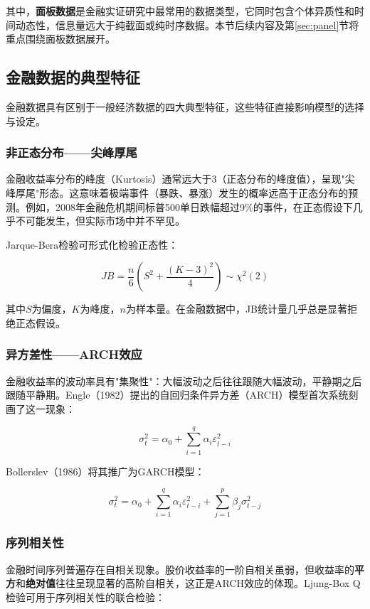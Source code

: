 其中，\textbf{面板数据}是金融实证研究中最常用的数据类型，它同时包含个体异质性和时间动态性，信息量远大于纯截面或纯时序数据。本节后续内容及第\ref{sec:panel}节将重点围绕面板数据展开。

\subsection{金融数据的典型特征}

金融数据具有区别于一般经济数据的四大典型特征，这些特征直接影响模型的选择与设定。

\subsubsection{非正态分布——尖峰厚尾}

金融收益率分布的峰度（Kurtosis）通常远大于3（正态分布的峰度值），呈现"尖峰厚尾"形态。这意味着极端事件（暴跌、暴涨）发生的概率远高于正态分布的预测。例如，2008年金融危机期间标普500单日跌幅超过9\%的事件，在正态假设下几乎不可能发生，但实际市场中并不罕见。

Jarque-Bera检验可形式化检验正态性：

\[
JB = \frac{n}{6}\left(S^2 + \frac{(K-3)^2}{4}\right) \sim \chi^2(2)
\]

其中$S$为偏度，$K$为峰度，$n$为样本量。在金融数据中，JB统计量几乎总是显著拒绝正态假设。

\subsubsection{异方差性——ARCH效应}

金融收益率的波动率具有"集聚性"：大幅波动之后往往跟随大幅波动，平静期之后跟随平静期。Engle（1982）提出的自回归条件异方差（ARCH）模型首次系统刻画了这一现象：

\[
\sigma_t^2 = \alpha_0 + \sum_{i=1}^{q} \alpha_i \varepsilon_{t-i}^2
\]

Bollerslev（1986）将其推广为GARCH模型：

\[
\sigma_t^2 = \alpha_0 + \sum_{i=1}^{q} \alpha_i \varepsilon_{t-i}^2 + \sum_{j=1}^{p} \beta_j \sigma_{t-j}^2
\]

\subsubsection{序列相关性}

金融时间序列普遍存在自相关现象。股价收益率的一阶自相关虽弱，但收益率的\textbf{平方}和\textbf{绝对值}往往呈现显著的高阶自相关，这正是ARCH效应的体现。Ljung-Box Q检验可用于序列相关性的联合检验：

